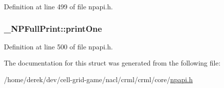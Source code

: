 Definition at line 499 of file npapi.h.

\hypertarget{struct___n_p_full_print_a809c29777645db1a739e48a30803c1f1}{
\subsubsection[{printOne}]{ {\bf \_\-NPFullPrint::printOne}}}
\label{struct___n_p_full_print_a809c29777645db1a739e48a30803c1f1}


Definition at line 500 of file npapi.h.



The documentation for this struct was generated from the following file:\begin{DoxyCompactItemize}
\item 
/home/derek/dev/cell-\/grid-\/game/nacl/crml/crml/core/\hyperlink{npapi_8h}{npapi.h}\end{DoxyCompactItemize}
